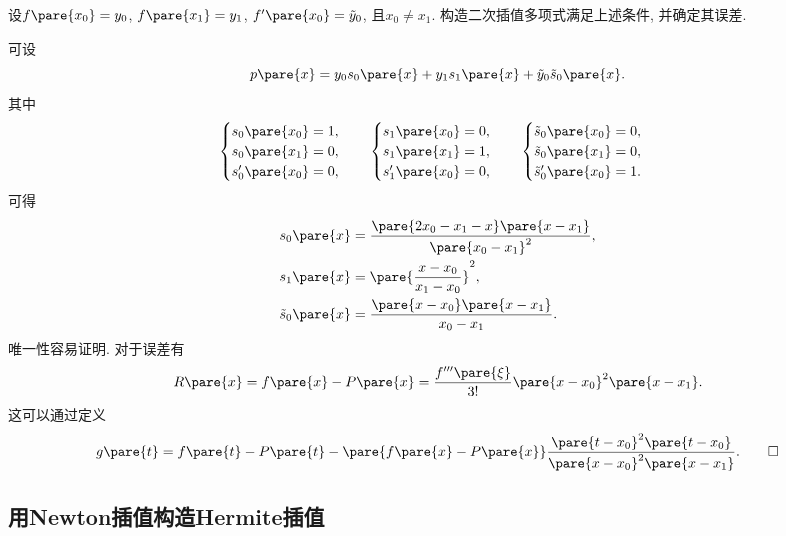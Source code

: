 \documentclass[hidelinks]{ctexart}
\begin{document}
\begin{ex}
    设$f\pare{x_0} = y_0$, $f\pare{x_1} = y_1$, $f'\pare{x_0} = \tilde{y}_0$, 且$x_0 \neq x_1$. 构造二次插值多项式满足上述条件, 并确定其误差.
\end{ex}
\begin{solution}
    可设
    \[ p\pare{x} = y_0 s_0\pare{x} + y_1 s_1\pare{x} + \tilde{y}_0 \tilde{s}_0\pare{x}. \]
    其中
    \[ \begin{cases}
        s_0\pare{x_0} = 1, \\
        s_0\pare{x_1} = 0, \\
        s'_0\pare{x_0} = 0,
    \end{cases}\quad \begin{cases}
        s_1\pare{x_0} = 0, \\
        s_1\pare{x_1} = 1, \\
        s'_1\pare{x_0} = 0,
    \end{cases}\quad \begin{cases}
        \tilde{s}_0\pare{x_0} = 0, \\
        \tilde{s}_0\pare{x_1} = 0, \\
        \tilde{s}'_0\pare{x_0} = 1.
    \end{cases} \]
    可得
    \begin{align*}
        & s_0\pare{x} = \frac{\pare{2x_0 - x_1 - x}\pare{x-x_1}}{\pare{x_0 - x_1}^2}, \\
        & s_1\pare{x} = \pare{\frac{x-x_0}{x_1-x_0}}^2, \\
        & \tilde{s}_0\pare{x} = \frac{\pare{x-x_0}\pare{x-x_1}}{x_0 - x_1}.
    \end{align*}
    唯一性容易证明. 对于误差有
    \[ R\pare{x} = f\pare{x} - P\pare{x} = \frac{f'''\pare{\xi}}{3!}\pare{x-x_0}^2\pare{x-x_1}. \]
    这可以通过定义
    \[ g\pare{t} = f\pare{t} - P\pare{t} - \pare{f\pare{x} - P\pare{x}}\frac{\pare{t-x_0}^2\pare{t-x_0}}{\pare{x-x_0}^2\pare{x-x_1}}. \qedhere \]
\end{solution}



\subsection{用Newton插值构造Hermite插值} %
\label{sub:用newton插值构造hermite插值}
\end{document}
